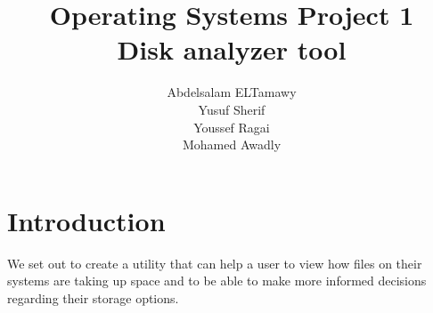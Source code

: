 \documentclass[]{article}
\author{Abdelsalam ELTamawy\\Yusuf Sherif\\Youssef Ragai\\Mohamed Awadly}
\title{Operating Systems Project 1\\Disk analyzer tool}
\begin{document}
    \maketitle

    \section{Introduction}
    We set out to create a utility that can help a user to view how files on their systems are taking up space and to be able to make more informed decisions regarding their storage options.
    
\end{document}
